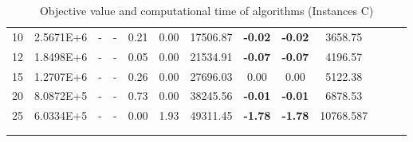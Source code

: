 {\begin{longtable}{@{}llccccccccccc@{}}
\multicolumn{1}{l|}{10} & \multicolumn{1}{l|}{2.5671E+6}  & \multicolumn{1}{c|}{-}       & \multicolumn{1}{c|}{-}    & \multicolumn{1}{c|}{0.21}   & 0.00 & \multicolumn{1}{c|}{17506.87} & \textbf{-0.02}  & \textbf{-0.02}  & 3658.75   \\
\multicolumn{1}{l|}{12} & \multicolumn{1}{l|}{1.8498E+6}  & \multicolumn{1}{c|}{-}       & \multicolumn{1}{c|}{-}    & \multicolumn{1}{c|}{0.05}   & 0.00 & \multicolumn{1}{c|}{21534.91} & \textbf{-0.07}  & \textbf{-0.07}  & 4196.57   \\
\multicolumn{1}{l|}{15} & \multicolumn{1}{l|}{1.2707E+6}  & \multicolumn{1}{c|}{-}       & \multicolumn{1}{c|}{-}    & \multicolumn{1}{c|}{0.26}   & 0.00 & \multicolumn{1}{c|}{27696.03} & 0.00            & 0.00            & 5122.38   \\
\multicolumn{1}{l|}{20} & \multicolumn{1}{l|}{8.0872E+5}  & \multicolumn{1}{c|}{-}       & \multicolumn{1}{c|}{-}    & \multicolumn{1}{c|}{0.73}   & 0.00 & \multicolumn{1}{c|}{38245.56} & \textbf{-0.01}  & \textbf{-0.01}  & 6878.53   \\
\multicolumn{1}{l|}{25} & \multicolumn{1}{l|}{6.0334E+5}  & \multicolumn{1}{c|}{-}       & \multicolumn{1}{c|}{-}    & \multicolumn{1}{c|}{0.00}   & 1.93 & \multicolumn{1}{c|}{49311.45} & \textbf{-1.78}  & \textbf{-1.78}  & 10768.587 \\ \hline
\caption{Objective value and computational time of algorithms (Instances C)}\\
\label{results-all-C}\\
\end{longtable}}
